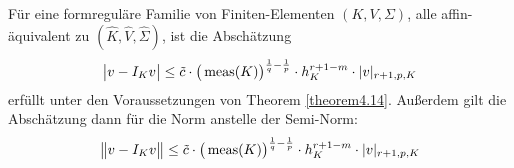 \begin{theorem}\label{theorem4.16}
Für eine formreguläre Familie von Finiten-Elementen $(K,V,\Sigma)$, alle affin-äquivalent zu $(\hat{K},\hat{V},\hat{\Sigma})$, ist die Abschätzung
\begin{align*}
\big| v-I_K v\big|\leq\tilde{c}\cdot\big(\operatorname{meas}(K)\big)^{\frac{1}{q}-\frac{1}{p}}\cdot h_K^{r+1-m}\cdot|v|_{r+1,p,K}
\end{align*}
erfüllt unter den Voraussetzungen von Theorem \ref{theorem4.14}. Außerdem gilt die Abschätzung dann für die Norm anstelle der Semi-Norm:
\begin{align*}
\big\Vert v-I_K v\big\Vert\leq\tilde{c}\cdot\big(\operatorname{meas}(K)\big)^{\frac{1}{q}-\frac{1}{p}}\cdot h_K^{r+1-m}\cdot|v|_{r+1,p,K}
\end{align*}
\end{theorem}

